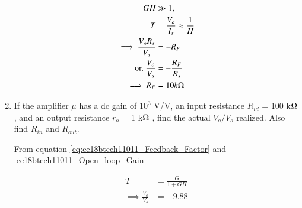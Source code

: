 \begin{enumerate}[label=\arabic*.,ref=\theenumi]
\begin{align}
GH &\gg 1,
\\
T &=\frac{V_{o}}{I_{s}} \approx  \frac{1}{H} 
\\
\label{eq:ee18btech11011_Closed_Loop_Gain2}
\implies \frac{V_{o}R_s}{V_{s}} &= -R_{F}\\
\text{or, } \frac{V_{o}}{V_{s}} &= -\frac{R_{F}}{R_s}
\\
\implies R_{F} &= 10k\ohm
\end{align}
\item If the amplifier $\mu$ has a dc gain of $10^3$ V/V, an input resistance $R_{i d}$ = 100 k$\ohm$ , and an output resistance $r_{o}$ = 1 k$\ohm$ , find the actual $V_{o}/V_{s}$ realized. Also find $R_{i n}$ and $R_{o u t}$.
\\
\solution 
%
%
%
%
%

%

From equation \ref{eq:ee18btech11011_Feedback_Factor} and \ref{ee18btech11011_Open_loop_Gain} 

\begin{align}
T &= \frac{G}{1+GH} 
\\
\implies \frac{V_{o}}{V_{s}} &=  -9.88
\label{eq:ee18btech11011_Value_of_Vo/Vs}
\end{align}


\end{enumerate}
